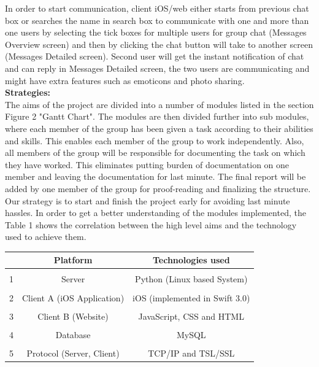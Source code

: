 \documentclass[12pt]{article}
\begin{document}
In order to start communication, client iOS/web either starts from previous chat box or searches the name in search box to communicate with one and more than one users by selecting the tick boxes for multiple users for group chat (Messages Overview screen) and then by clicking the chat button will take to another screen (Messages Detailed screen). Second user will get the instant notification of chat and can reply in Messages Detailed screen, the two users are communicating and might have extra features such as emoticons and photo sharing.\\
\textbf{Strategies:} \\
The aims of the project are divided into a number of modules listed in the section Figure 2 "Gantt Chart". The modules are then divided further into sub modules, where each member of the group has been given a task according to their abilities and skills. This enables each member of the group to work independently. Also, all members of the group will be responsible for documenting the task on which they have worked. This eliminates putting burden of documentation on one member and leaving the documentation for last minute. The final report will be added by one member of the group for proof-reading and finalizing the structure. Our strategy is to start and finish the project early for avoiding last minute hassles. In order to get a better understanding of the modules implemented, the Table 1 shows the correlation between the high level aims and the technology used to achieve them. \\

\begin{table}[!ht]
\centering
{} \label{tab:title} 
\smallskip
\begin{tabular}{l c c}
\hline
& Platform & Technologies used\\[0.5ex]
\hline
&&\\[-2ex]
1 & Server & Python (Linux based System) \\[0.5ex]
\hline
&&\\[-2ex]
2 & Client A (iOS Application) & iOS (implemented in Swift 3.0) \\[0.5ex]
\hline
&&\\[-2ex]
3 & Client B (Website) & JavaScript, CSS and HTML \\[0.5ex]
\hline
&&\\[-2ex]
4 & Database & MySQL \\[0.5ex]
\hline
&&\\[-2ex]
5 & Protocol (Server, Client) & TCP/IP and TSL/SSL \\[0.5ex]
\hline
\end{tabular}
\end{table}
\end{document}
